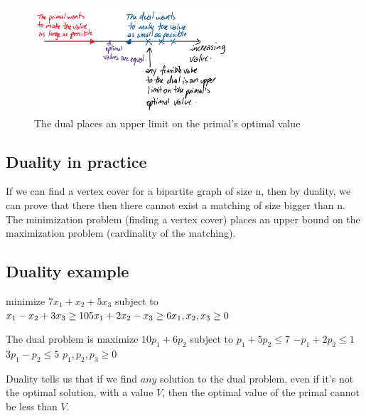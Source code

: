 \documentclass[twoside]{article}
\begin{document}
\begin{figure}[!ht]
  \includegraphics[width=3in]{dual_line.png}
  \caption{The dual places an upper limit on the primal's optimal value}
  \label{fig:dual_number_line}
\end{figure}

\subsection{Duality in practice}
If we can find a vertex cover for a bipartite graph of size n, then by duality, we can prove that there then there cannot exist a matching of size bigger than n. The minimization problem (finding a vertex cover) places an upper bound on the maximization problem (cardinality of the matching).

\subsection{Duality example}

minimize \newline 
$7x_1 + x_2 + 5x_3 $ \newline
subject to \newline
$x_1 - x_2 + 3 x_3 \geq 10 \newline
5 x_1 + 2x_2 -x_3 \geq 6 \newline
x_1,x_2,x_3 \geq 0 $


The dual problem is
\newline
\newline maximize 
\newline $ 10 p_1 + 6 p_2 $
\newline subject to
\newline $p_1 + 5 p_2 \leq 7$
\newline $-p_1 + 2 p_2 \leq 1 $
\newline $ 3 p_1 - p_2 \leq 5 $
\newline $p_1,p_2,p_3 \geq 0$

Duality tells us that if we find $any$ solution to the dual problem, even if it's not the optimal solution, with a value $V$, then the optimal value of the primal cannot be less than $V$.
\end{document}
